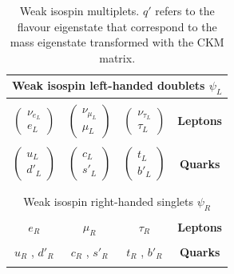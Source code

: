 \begin{table}[htb]\centering\begin{tabular}{cccc}
\multicolumn{4}{c}{Weak isospin left-handed doublets \bfseries $\psi_{L}$} \\ \hline \\ 
$\begin{pmatrix} \nu_{e_{L}} \\ e_{L} \end{pmatrix}$ & $\begin{pmatrix} \nu_{\mu_{L}} \\ \mu_{L} \end{pmatrix}$ &$\begin{pmatrix} \nu_{\tau_{L}} \\ \tau_{L} \end{pmatrix}$ & \bfseries Leptons \\ \\ 
$\begin{pmatrix} u_{L} \\ d'_{L} \end{pmatrix}$ & $\begin{pmatrix} c_{L} \\ s'_{L} \end{pmatrix}$ &$\begin{pmatrix} t_{L} \\ b'_{L} \end{pmatrix}$ & \bfseries Quarks \\
 \\ \hline \hline\\ 
\multicolumn{4}{c}{Weak isospin right-handed singlets \bfseries $\psi_{R}$} \\ \hline \\ 
$ e_{R} $ & $ \mu_{R}$ &$\tau_{R}$ & \bfseries Leptons \\ \\ 
$u_{R}$ , $d'_{R} $ & $c_{R}$ , $s'_{R} $ &$ t_{R}$ , $b'_{R}$ & \bfseries Quarks \\
 \\ \hline \hline
\end{tabular}\caption{Weak isospin multiplets. $q'$ refers to the flavour eigenstate that correspond to the mass eigenstate transformed with the CKM matrix.}\label{tab:isospin} \end{table}

